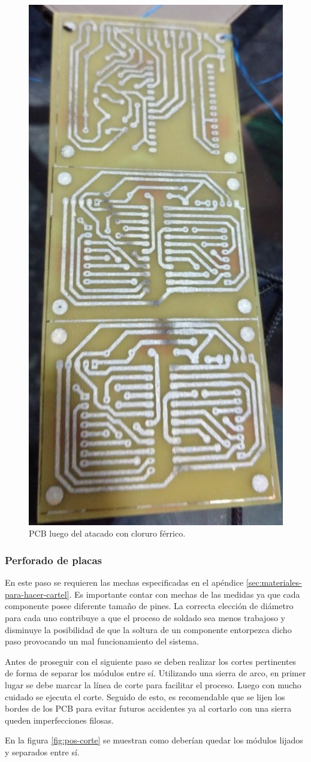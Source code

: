 \begin{figure}[ht!]
	\centering
	\includegraphics[width=0.3\linewidth]{imagenes/pcbeando/pos-acido-2.jpeg}
	\caption{PCB luego del atacado con cloruro férrico.}
	\label{fig:pos-acido}
\end{figure}

\subsubsection{Perforado de placas}
En este paso se requieren las mechas especificadas en el apéndice \ref{sec:materiales-para-hacer-cartel}. Es importante contar con mechas de las medidas ya que cada componente posee diferente tamaño de pines. La correcta elección de diámetro para cada uno contribuye a que el proceso de soldado sea menos trabajoso y disminuye la posibilidad de que la soltura de un componente entorpezca dicho paso provocando un mal funcionamiento del sistema.

Antes de proseguir con el siguiente paso se deben realizar los cortes pertinentes de forma de separar los módulos entre sí. Utilizando una sierra de arco, en primer lugar se debe marcar la línea de corte para facilitar el proceso.
Luego con mucho cuidado se ejecuta el corte. Seguido de esto, es recomendable que se lijen los bordes de los PCB para evitar futuros accidentes ya al cortarlo con una sierra queden imperfecciones filosas.

En la figura \ref{fig:pos-corte} se muestran como deberían quedar los módulos lijados y separados entre sí.

